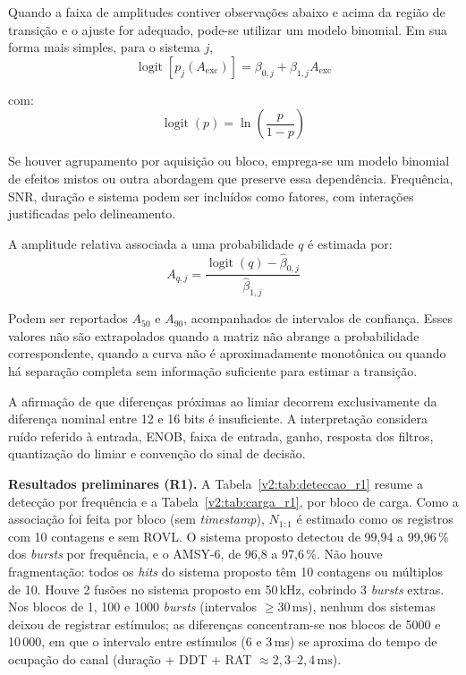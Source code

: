 Quando a faixa de amplitudes contiver observações abaixo e acima da região de transição e o ajuste for adequado, pode-se utilizar um modelo binomial. Em sua forma mais simples, para o sistema \(j\),
\begin{equation}
	\operatorname{logit} \left[p_j\left(A_{\mathrm{exc}}\right) \right] = \beta_{0,j} + \beta_{1,j}A_{\mathrm{exc}}	\label{v2:eq:modelo_deteccao_logistico}
\end{equation}

\noindent
com:
\begin{equation}
	\operatorname{logit}(p) = \ln \left(\frac{p}{1-p}\right)
\end{equation}

Se houver agrupamento por aquisição ou bloco, emprega-se um modelo binomial de efeitos mistos ou outra abordagem que preserve essa dependência. Frequência, SNR, duração e sistema podem ser incluídos como fatores, com interações justificadas pelo delineamento. 

A amplitude relativa associada a uma probabilidade \(q\) é estimada por:
\begin{equation}
	A_{q,j} = \frac{\operatorname{logit}(q)-\widehat{\beta}_{0,j}}{\widehat{\beta}_{1,j}}
	\label{v2:eq:amplitude_probabilidade_deteccao}
\end{equation}

Podem ser reportados \(A_{50}\) e \(A_{90}\), acompanhados de intervalos de confiança. Esses valores não são extrapolados quando a matriz não abrange a probabilidade correspondente, quando a curva não é aproximadamente monotônica ou quando há separação completa sem informação suficiente para estimar a transição.

A afirmação de que diferenças próximas ao limiar decorrem exclusivamente da diferença nominal entre 12 e 16 bits é insuficiente. A interpretação considera ruído referido à entrada, ENOB, faixa de entrada, ganho, resposta dos filtros, quantização do limiar e convenção do sinal de decisão.

\textbf{Resultados preliminares (R1).} A Tabela~\ref{v2:tab:deteccao_r1} resume a detecção por frequência e a Tabela~\ref{v2:tab:carga_r1}, por bloco de carga. Como a associação foi feita por bloco (sem \textit{timestamp}), \(N_{1:1}\) é estimado como os registros com 10 contagens e sem ROVL. O sistema proposto detectou de 99,94 a 99,96\,\% dos \textit{bursts} por frequência, e o AMSY-6, de 96,8 a 97,6\,\%. Não houve fragmentação: todos os \textit{hits} do sistema proposto têm 10 contagens ou múltiplos de 10. Houve 2 fusões no sistema proposto em 50\,kHz, cobrindo 3 \textit{bursts} extras. Nos blocos de 1, 100 e 1000 \textit{bursts} (intervalos \(\ge 30\,\mathrm{ms}\)), nenhum dos sistemas deixou de registrar estímulos; as diferenças concentram-se nos blocos de 5000 e 10\,000, em que o intervalo entre estímulos (6 e 3\,ms) se aproxima do tempo de ocupação do canal (duração + DDT + RAT \(\approx 2{,}3\)--\(2{,}4\,\mathrm{ms}\)).

